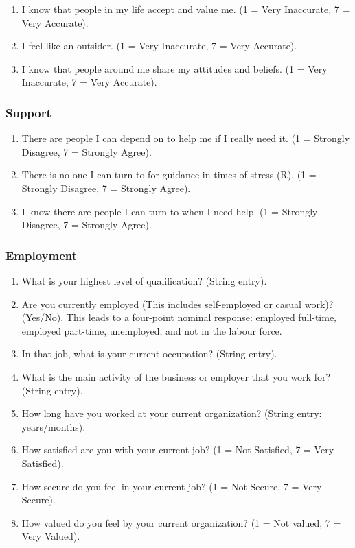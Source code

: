 \documentclass[
]{interact}
\providecommand{\tightlist}{%
  \setlength{\itemsep}{0pt}\setlength{\parskip}{0pt}}\usepackage{longtable,booktabs,array}
\begin{document}
\begin{enumerate}
\def\labelenumi{\arabic{enumi}.}
\tightlist
\item
  I know that people in my life accept and value me. (1 = Very
  Inaccurate, 7 = Very Accurate).
\item
  I feel like an outsider. (1 = Very Inaccurate, 7 = Very Accurate).
\item
  I know that people around me share my attitudes and beliefs. (1 = Very
  Inaccurate, 7 = Very Accurate).
\end{enumerate}

\subsubsection{Support}\label{support}

\begin{enumerate}
\def\labelenumi{\arabic{enumi}.}
\tightlist
\item
  There are people I can depend on to help me if I really need it. (1 =
  Strongly Disagree, 7 = Strongly Agree).
\item
  There is no one I can turn to for guidance in times of stress (R). (1
  = Strongly Disagree, 7 = Strongly Agree).
\item
  I know there are people I can turn to when I need help. (1 = Strongly
  Disagree, 7 = Strongly Agree).
\end{enumerate}

\subsubsection{Employment}\label{employment}

\begin{enumerate}
\def\labelenumi{\arabic{enumi}.}
\tightlist
\item
  What is your highest level of qualification? (String entry).
\item
  Are you currently employed (This includes self-employed or casual
  work)? (Yes/No). This leads to a four-point nominal response: employed
  full-time, employed part-time, unemployed, and not in the labour
  force.
\item
  In that job, what is your current occupation? (String entry).
\item
  What is the main activity of the business or employer that you work
  for? (String entry).
\item
  How long have you worked at your current organization? (String entry:
  years/months).
\item
  How satisfied are you with your current job? (1 = Not Satisfied, 7 =
  Very Satisfied).
\item
  How secure do you feel in your current job? (1 = Not Secure, 7 = Very
  Secure).
\item
  How valued do you feel by your current organization? (1 = Not valued,
  7 = Very Valued).
\end{enumerate}
\end{document}
